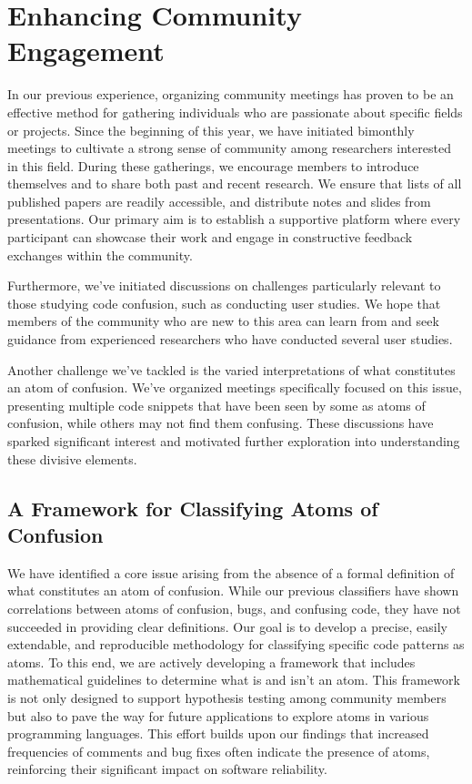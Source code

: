 \documentclass[conference]{IEEEtran}
\begin{document}
\section{Enhancing Community Engagement}


In our previous experience, organizing community meetings has 
proven to be an effective method for gathering individuals who 
are passionate about specific fields or projects. Since the 
beginning of this year, we have initiated bimonthly meetings 
to cultivate a strong sense of community among researchers 
interested in this field. During these gatherings, we 
encourage members to introduce themselves and to share both 
past and recent research. We ensure that lists of all 
published papers are readily accessible, and distribute notes 
and slides from presentations. Our primary aim is to establish 
a supportive platform where every participant can showcase 
their work and engage in constructive feedback exchanges 
within the community.

Furthermore, we've initiated discussions on challenges 
particularly relevant to those studying code confusion, such 
as conducting user studies. We hope that members of the 
community who are new to this area can learn from and seek 
guidance from experienced researchers who have conducted 
several user studies.

Another challenge we've tackled is the varied interpretations 
of what constitutes an atom of confusion. We've organized 
meetings specifically focused on this issue, presenting 
multiple code snippets that have been seen by some as atoms of 
confusion, while others may not find them confusing. These 
discussions have sparked significant interest and motivated 
further exploration into understanding these divisive 
elements.


\subsection{A Framework for Classifying Atoms of Confusion}

We have identified a core issue arising from the absence of a 
formal definition of what constitutes an atom of confusion. 
While our previous classifiers \cite{gopstein2018prevalence} 
have shown correlations between atoms of confusion, bugs, and 
confusing code, they have not succeeded in providing clear 
definitions. Our goal is to develop a precise, easily 
extendable, and reproducible methodology for classifying 
specific code patterns as atoms. To this end, we are actively 
developing a framework that includes mathematical guidelines 
to determine what is and isn't an atom. This framework is not 
only designed to support hypothesis testing among community 
members but also to pave the way for future applications to 
explore atoms in various programming languages. This effort 
builds upon our findings that increased frequencies of 
comments and bug fixes often indicate the presence of atoms, 
reinforcing their significant impact on software reliability.
\end{document}
